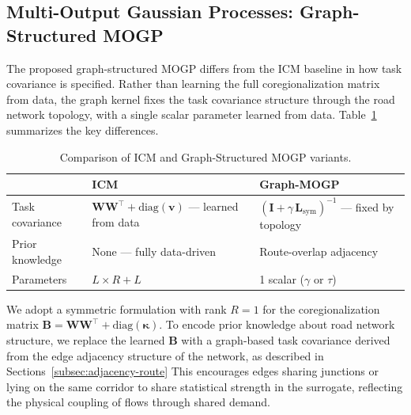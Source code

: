 \documentclass[11pt]{article}
\begin{document}

\newpage


\subsection{Multi-Output Gaussian Processes: Graph-Structured MOGP}
\label{subsec:graph-mogp}

The proposed graph-structured MOGP differs from the ICM baseline in how task
covariance is specified. Rather than learning the full coregionalization matrix
from data, the graph kernel fixes the task covariance structure through the road
network topology, with a single scalar parameter learned from data.
Table~\ref{tab:mogp-comparison} summarizes the key differences.

\begin{table}[ht]
\centering
\caption{Comparison of ICM and Graph-Structured MOGP variants.}
\label{tab:mogp-comparison}




\begin{tabular}{lp{5cm}p{5cm}}
\toprule
 & \textbf{ICM} & \textbf{Graph-MOGP} \\
\midrule
Task covariance
    & $\mathbf{W}\mathbf{W}^\top + \mathrm{diag}(\mathbf{v})$ — learned from data
    & $(\mathbf{I} + \gamma\,\mathbf{L}_{\mathrm{sym}})^{-1}$ — fixed by topology \\[4pt]
Prior knowledge
    & None — fully data-driven
    & Route-overlap adjacency \\[4pt]
Parameters
    & $L \times R + L$
    & 1 scalar ($\gamma$ or $\tau$) \\
\bottomrule
\end{tabular}

\end{table}
We adopt a symmetric formulation with rank $R = 1$ for the coregionalization
matrix $\mathbf{B} = \mathbf{W}\mathbf{W}^\top + \mathrm{diag}(\boldsymbol{\kappa})$.
To encode prior knowledge about road network structure, we replace the learned
$\mathbf{B}$ with a graph-based task covariance derived from the edge adjacency
structure of the network, as described in
Sections~\ref{subsec:adjacency-route}
This encourages edges sharing junctions or lying on the same corridor to share
statistical strength in the surrogate, reflecting the physical coupling of flows
through shared demand.


\end{document}
